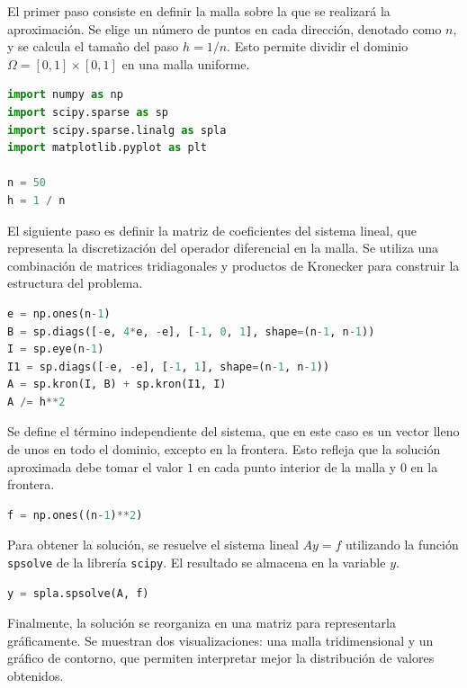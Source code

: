 \documentclass[a4paper,11pt,spanish, twoside, leqno]{tfg-uam}
\theoremstyle{definition}
\begin{document}
El primer paso consiste en definir la malla sobre la que se realizará la aproximación. Se elige un número de puntos en cada dirección, denotado como $n$, y se calcula el tamaño del paso $h = 1/n$. Esto permite dividir el dominio $\Omega = [0,1] \times [0,1]$ en una malla uniforme.

\begin{lstlisting}[language=Python] 
import numpy as np
import scipy.sparse as sp
import scipy.sparse.linalg as spla
import matplotlib.pyplot as plt

n = 50
h = 1 / n
\end{lstlisting}

El siguiente paso es definir la matriz de coeficientes del sistema lineal, que representa la discretización del operador diferencial en la malla. Se utiliza una combinación de matrices tridiagonales y productos de Kronecker para construir la estructura del problema.

\begin{lstlisting}[language=Python] 
e = np.ones(n-1)
B = sp.diags([-e, 4*e, -e], [-1, 0, 1], shape=(n-1, n-1))
I = sp.eye(n-1)
I1 = sp.diags([-e, -e], [-1, 1], shape=(n-1, n-1))
A = sp.kron(I, B) + sp.kron(I1, I)
A /= h**2
\end{lstlisting}

Se define el término independiente del sistema, que en este caso es un vector lleno de unos en todo el dominio, excepto en la frontera. Esto refleja que la solución aproximada debe tomar el valor $1$ en cada punto interior de la malla y $0$ en la frontera.

\begin{lstlisting}[language=Python] 
f = np.ones((n-1)**2)
\end{lstlisting}

Para obtener la solución, se resuelve el sistema lineal $A y = f$ utilizando la función \texttt{spsolve} de la librería \texttt{scipy}. El resultado se almacena en la variable $y$.

\begin{lstlisting}[language=Python] 
y = spla.spsolve(A, f)
\end{lstlisting}

Finalmente, la solución se reorganiza en una matriz para representarla gráficamente. Se muestran dos visualizaciones: una malla tridimensional y un gráfico de contorno, que permiten interpretar mejor la distribución de valores obtenidos.
\end{document}
